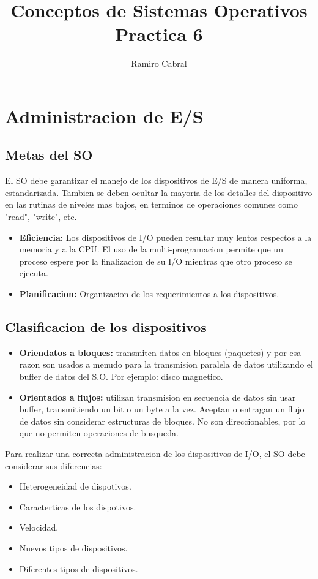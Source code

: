 \documentclass[12pt]{article}
\title{\Huge{Conceptos de Sistemas Operativos\\
Practica 6}}
\author{\huge{Ramiro Cabral}}
\date{}
\begin{document}
\maketitle
\pagebreak
\section{Administracion de E/S}


\subsection{Metas del SO}
El SO debe garantizar el manejo de los dispositivos de E/S de manera uniforma, estandarizada. Tambien se deben ocultar la mayoria de los detalles del dispositivo en las rutinas de niveles mas bajos, en terminos de operaciones comunes como "read", "write", etc.

\begin{itemize}
    \item \textbf{Eficiencia:} Los dispositivos de I/O pueden resultar muy lentos respectos a la memoria y a la CPU.
El uso de la multi-programacion permite que un proceso espere por la finalizacion de su I/O mientras que otro proceso se ejecuta.
\item \textbf{Planificacion:} Organizacion de los requerimientos a los dispositivos.
\end{itemize}


\subsection{Clasificacion de los dispositivos}
\begin{itemize}
    \item \textbf{Oriendatos a bloques:} transmiten datos en bloques (paquetes) y por esa razon son usados a menudo para la transmision paralela de datos utilizando el buffer de datos del S.O. Por ejemplo: disco magnetico.
    \item \textbf{Orientados a flujos:} utilizan transmision en secuencia de datos sin usar buffer, transmitiendo un bit o un byte a la vez. Aceptan o entragan un flujo de datos sin considerar estructuras de bloques. No son direccionables, por lo que no permiten operaciones de busqueda.
\end{itemize}

Para realizar una correcta administracion de los dispositivos de I/O, el SO debe considerar sus diferencias:
\begin{itemize}
    \item Heterogeneidad de dispotivos.
    \item Caracterticas de los dispotivos.
    \item Velocidad.
    \item Nuevos tipos de dispositivos.
    \item Diferentes tipos de dispositivos.
\end{itemize}
\end{document}
